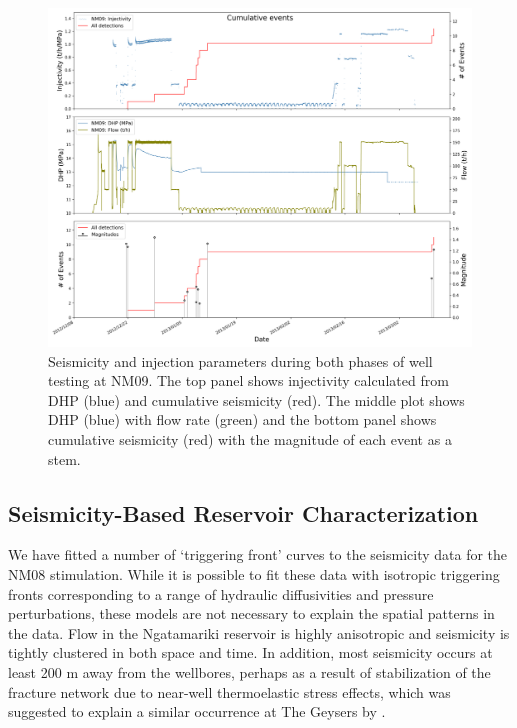 \begin{figure}[h!]
\begin{center}
\includegraphics[width=1.00\columnwidth]{Chapter_3_Nga/figures/NM09_params/Full_final_cat_flow_DHP_mags_FMs_NM09_Stim_BOTH_11-1}
\caption[NM09 stimulation parameters]{{Seismicity and injection parameters during both phases of well testing at
NM09. The top panel shows \gls{injectivity} calculated from \acrshort{DHP} (blue) and
cumulative seismicity (red). The middle plot shows \acrshort{DHP} (blue) with flow
rate (green) and the bottom panel shows cumulative seismicity (red) with
the magnitude of each event as a stem.
{\label{736975}}%
}}
\end{center}
\end{figure}

\subsection{Seismicity-Based Reservoir Characterization}
We have fitted a number of `triggering front' curves to the seismicity data for the NM08 stimulation. While it is possible to fit these data with isotropic triggering fronts corresponding to a range of hydraulic diffusivities and pressure perturbations, these models are not necessary to explain the spatial patterns in the data. Flow in the Ngatamariki reservoir is highly anisotropic and seismicity is tightly clustered in both space and time. In addition, most seismicity occurs at least 200 m away from the wellbores, perhaps as a result of stabilization of the fracture network due to near-well thermoelastic stress effects, which was suggested to explain a similar occurrence at The Geysers by \citet{Jeanne_2014}.

